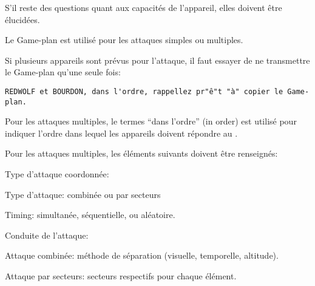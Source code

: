 \begin{e1}
	\item S'il reste des questions quant aux capacités de l'appareil, elles doivent être élucidées.
	
	\begin{minipage}{\linewidth}
		\item Le Game-plan est utilisé pour les attaques simples ou multiples.
		
		Si plusieurs appareils sont prévus pour l'attaque, il faut essayer de ne transmettre le Game-plan qu'une seule fois:
		\begin{lstlisting}[caption=Game-plan: transmission unique, label=gameplansingletx]
	REDWOLF et BOURDON, dans l'ordre, rappellez pr"ê"t "à" copier le Game-plan.
		\end{lstlisting}
	\end{minipage}
	
	\item Pour les attaques multiples, le termes ``dans l'ordre'' (in order) est utilisé pour indiquer l'ordre dans lequel les appareils doivent répondre au \ja{}.
	
	Pour les attaques multiples, les éléments suivants doivent être renseignés:
	
	\begin{e2}
		
		\item Type d'attaque coordonnée:
		
		\begin{e3}
			
			\item Type d'attaque: combinée ou par secteurs
			
			\item Timing: simultanée, séquentielle, ou aléatoire.
			
		\end{e3}
		
		\item Conduite de l'attaque:
		
		\begin{e3}
			
			\item Attaque combinée: méthode de séparation (visuelle, temporelle, altitude).
			
			\begin{minipage}{\linewidth}
				
				\item Attaque par secteurs: secteurs respectifs pour chaque élément.
				

\end{minipage}
\end{e3}
\end{e2}
\end{e1}
